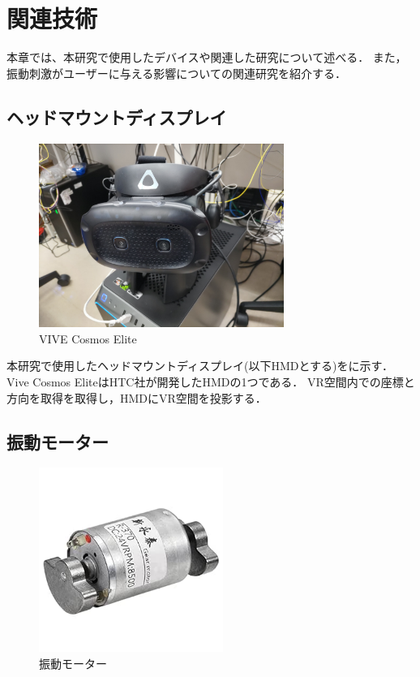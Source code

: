 \chapter{関連技術}

本章では、本研究で使用したデバイスや関連した研究について述べる．
また，振動刺激がユーザーに与える影響についての関連研究を紹介する．

\section{ヘッドマウントディスプレイ}

\begin{figure}[h]
\centering
\includegraphics[clip,width=8cm]{./fig/VIVE.png}
\caption{VIVE Cosmos Elite}\label{vive}
\end{figure}

本研究で使用したヘッドマウントディスプレイ(以下HMDとする)をに示す．
Vive Cosmos Elite\cite{VCE}はHTC社が開発したHMDの1つである．
VR空間内での座標と方向を取得を取得し，HMDにVR空間を投影する．




\newpage

\section{振動モーター}

\begin{figure}[h]
\centering
\includegraphics[clip,width=6cm]{./fig/Motor.jpg}
\caption{振動モーター}\label{motor}
\end{figure}

